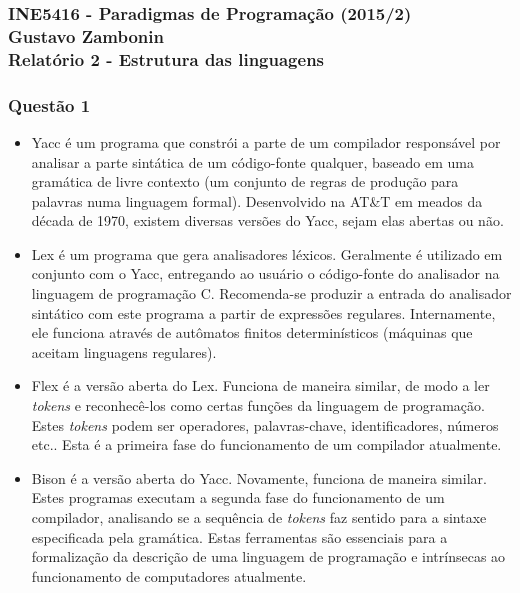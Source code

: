 \documentclass{article}
\begin{document}
\subsubsection*{INE5416 - Paradigmas de Programação (2015/2) \\
    Gustavo Zambonin \\
    Relatório 2 - Estrutura das linguagens
}

\subsubsection*{Questão 1}
\begin{itemize}
    \item Yacc é um programa que constrói a parte de um compilador responsável
    por analisar a parte sintática de um código-fonte qualquer, baseado em uma
    gramática de livre contexto (um conjunto de regras de produção para palavras
    numa linguagem formal). Desenvolvido na AT\&T em meados da década de 1970,
    existem diversas versões do Yacc, sejam elas abertas ou não.

    \item Lex é um programa que gera analisadores léxicos. Geralmente é
    utilizado em conjunto com o Yacc, entregando ao usuário o código-fonte do
    analisador na linguagem de programação C. Recomenda-se produzir a entrada do
    analisador sintático com este programa a partir de expressões regulares.
    Internamente, ele funciona através de autômatos finitos determinísticos
    (máquinas que aceitam linguagens regulares).

    \item Flex é a versão aberta do Lex. Funciona de maneira similar, de modo a
    ler \textit{tokens} e reconhecê-los como certas funções da linguagem de
    programação. Estes \textit{tokens} podem ser operadores, palavras-chave,
    identificadores, números etc.. Esta é a primeira fase do funcionamento de um
    compilador atualmente.

    \item Bison é a versão aberta do Yacc. Novamente, funciona de maneira
    similar. Estes programas executam a segunda fase do funcionamento de um
    compilador, analisando se a sequência de \textit{tokens} faz sentido para a
    sintaxe especificada pela gramática. Estas ferramentas são essenciais para a
    formalização da descrição de uma linguagem de programação e intrínsecas ao
    funcionamento de computadores atualmente.
\end{itemize}
\end{document}
